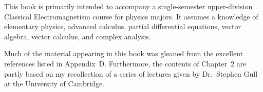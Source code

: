 This book is primarily intended to accompany a single-semester upper-division Classical
Electromagnetism course for physics majors. It assumes a knowledge of
elementary physics, advanced calculus, partial differential equations, vector algebra, vector calculus, and
complex analysis.

Much of the material appearing in this book was gleaned from the excellent 
references listed in Appendix~D. Furthermore, the contents of Chapter~2 are partly
based on my recollection of a series of lectures given by Dr.~Stephen Gull
at the University of Cambridge.
